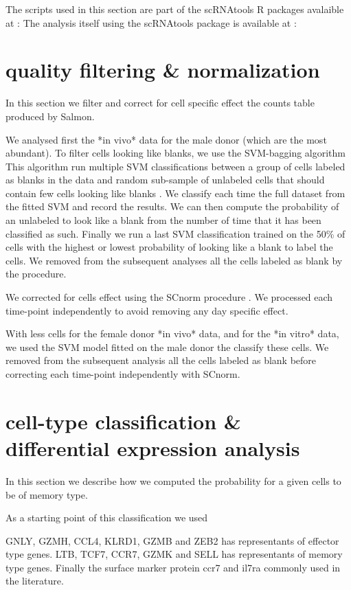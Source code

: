 \documentclass[a4paper,12pt]{article}
\begin{document}
The scripts used in this section are part of the scRNAtools R packages avalaible at :
The analysis itself using the scRNAtools package is available at :

\section{quality filtering \& normalization}

In this section we filter and correct for cell specific effect the counts table produced by Salmon.

We analysed first the *in vivo* data for the male donor (which are the most abundant).
To filter cells looking like blanks, we use the SVM-bagging algorithm
This algorithm run multiple SVM classifications between a group of cells labeled as blanks in the data and random sub-sample of unlabeled cells that should contain few cells looking like blanks \cite{mordeletBaggingSVMLearn2014b}.
We classify each time the full dataset from the fitted SVM and record the results.
We can then compute the probability of an unlabeled to look like a blank from the number of time that it has been classified as such.
Finally we run a last SVM classification trained on the 50\% of cells with the highest or lowest probability of looking like a blank to label the cells.
We removed from the subsequent analyses all the cells labeled as blank by the procedure.

We corrected for cells effect using the SCnorm procedure \cite{bacherSCnormRobustNormalization2017e}.
We processed each time-point independently to avoid removing any day specific effect.

With less cells for the female donor *in vivo* data, and for the *in vitro* data, we used the SVM model fitted on the male donor the classify these cells.
We removed from the subsequent analysis all the cells labeled as blank before correcting each time-point independently with SCnorm.


\section{cell-type classification \& differential expression analysis}

In this section we describe how we computed the probability for a given cells to be of memory type.

As a starting point of this classification we used

GNLY, GZMH, CCL4, KLRD1, GZMB and ZEB2 has representants of effector type genes.
LTB, TCF7, CCR7, GZMK and SELL has representants of memory type genes.
Finally the surface marker protein ccr7 and il7ra commonly used in the literature.



\cite{durifHighDimensionalClassification2018}
\cite{fournierADModelBuilder2012, skaugGeneralizedLinearMixed2016}




\end{document}
